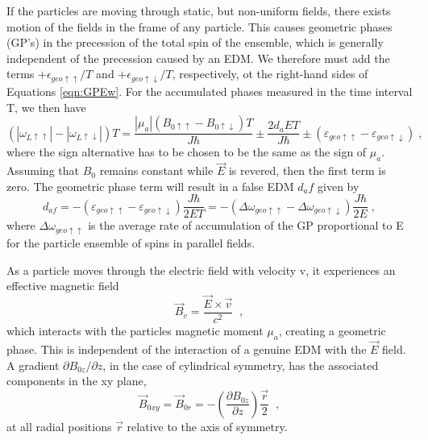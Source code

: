 If the particles are moving through static, but non-uniform fields,
there exists motion of the fields in the frame of any particle.  This
causes geometric phases (GP's) in the precession of the total spin of
the ensemble, which is generally independent of the precession caused
by an EDM.  We therefore must add the terms
$+\epsilon_{geo\uparrow\uparrow}/T$ and
$+\epsilon_{geo\uparrow\downarrow}/T$, respectively, ot the right-hand
sides of Equations \ref{eqn:GPEw}.  For the accumulated phases
measured in the time interval T, we then have
%
\begin{equation}
(|\omega_{L\uparrow\uparrow}| - |\omega_{L\uparrow\downarrow}|)T = \frac{|\mu_a|(B_{0\uparrow\uparrow} - B_{0\uparrow\downarrow})T}{J\hbar} \pm \frac{2 d_{a} E T}{J \hbar} \pm (\varepsilon_{geo\uparrow\uparrow} -\varepsilon_{geo\uparrow\downarrow}) \;,
\end{equation}
%
where the sign alternative has to be chosen to be the same as the sign
of $\mu_a$.  Assuming that $B_0$ remains constant while $\vec{E}$ is
revered, then the first term is zero.  The geometric phase term will
result in a false EDM $d_af$ given by
%
\begin{equation}
\label{eqn:daf}
d_{af} = -(\varepsilon_{geo\uparrow\uparrow} -\varepsilon_{geo\uparrow\downarrow})\frac{J\hbar}{2 E T} = -(\Delta \omega_{geo\uparrow\uparrow} - \Delta \omega_{geo\uparrow\downarrow})\frac{J\hbar}{2E} \; ,
\end{equation}
%
where $\Delta \omega_{geo\uparrow\uparrow}$ is the average rate of
accumulation of the GP proportional to E for the particle ensemble of
spins in parallel fields.

As a particle moves through the electric field with velocity v, it
experiences an effective magnetic field
%
\begin{equation}
\label{eqn:Bv}
\vec{B}_v = \frac{\vec{E} \times \vec{v}}{c^2} \;\;,
\end{equation}
%
which interacts with the particles magnetic moment $\mu_a$, creating a
geometric phase.  This is independent of the interaction of a genuine
EDM with the $\vec{E}$ field.
%
A gradient $\partial B_{0z}/\partial z$, in the case of cylindrical
symmetry, has the associated components in the xy plane,
%
\begin{equation}
\label{eqn:Bxy}
\vec{B}_{0xy} = \vec{B}_{0r} = - \left( \frac{\partial B_{0z}}{\partial z} \right) \frac{\vec{r}}{2} \;\; ,
\end{equation} 
%
at all radial positions $\vec{r}$ relative to the axis of symmetry.


